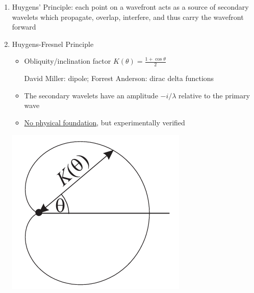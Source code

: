 \documentclass{article}
\theoremstyle{remark}
\theoremstyle{remark}
\begin{document}
\begin{enumerate}
\begin{itemize}
        \end{itemize}
    \item Huygens' Principle: each point on a wavefront acts as a source of secondary wavelets which propagate, overlap, interfere, and thus carry the wavefront forward
    \item Huygens-Fresnel Principle\newline
        \begin{minipage}{0.7\linewidth}
            \begin{itemize}
                \item Obliquity/inclination factor $K(\theta)=\frac{1+\cos\theta}{2}$
                
                David Miller: dipole; Forrest Anderson: dirac delta functions
                \item The secondary wavelets have an amplitude $-i/\lambda$ relative to the primary wave
                \item \href{https://en.wikipedia.org/wiki/Huygens%E2%80%93Fresnel_principle#:~:text=The%20Huygens%E2%80%93Fresnel%20principle%20(named,from%20different%20points%20mutually%20interfere.}{No physical foundation}, but experimentally verified
            \end{itemize}
        \end{minipage}
        \begin{minipage}{0.3\linewidth}
            \includegraphics*[width=\linewidth]{obliquity factor.png}

\end{minipage}
\end{enumerate}
\end{document}
